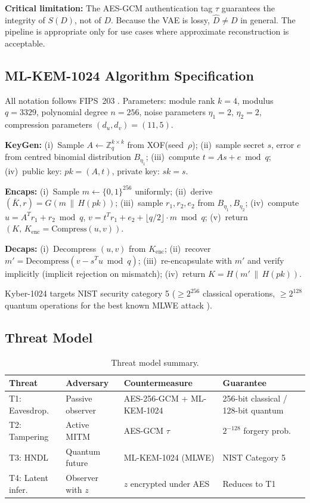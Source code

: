 \documentclass[twocolumn]{article}
\begin{document}
\smallskip
\noindent\textbf{Critical limitation:} The AES-GCM authentication tag $\tau$
guarantees the integrity of $S(D)$, not of $D$. Because the VAE is lossy,
$\hat{D} \neq D$ in general. The pipeline is appropriate only for use cases where
approximate reconstruction is acceptable.

\subsection{ML-KEM-1024 Algorithm Specification}

All notation follows FIPS~203 \cite{fips203}. Parameters: module rank $k = 4$,
modulus $q = 3329$, polynomial degree $n = 256$, noise parameters $\eta_1 = 2$,
$\eta_2 = 2$, compression parameters $(d_u, d_v) = (11, 5)$.

\textbf{KeyGen:} (i)~Sample $A \leftarrow \mathbb{Z}_q^{k\times k}$ from XOF(seed~$\rho$);
(ii)~sample secret $s$, error $e$ from centred binomial distribution $B_{\eta_1}$;
(iii)~compute $t = As + e \bmod q$; (iv)~public key: $pk = (A,t)$, private key: $sk = s$.

\textbf{Encaps:} (i)~Sample $m \leftarrow \{0,1\}^{256}$ uniformly; (ii)~derive
$(\bar{K}, r) = G(m \,\|\, H(pk))$; (iii)~sample $r_1,r_2,e_2$ from
$B_{\eta_1},B_{\eta_2}$; (iv)~compute $u = A^T r_1 + r_2 \bmod q$, $v = t^T r_1
+ e_2 + \lfloor q/2 \rfloor \cdot m \bmod q$; (v)~return $(K,\,K_\text{enc} =
\text{Compress}(u,v))$.

\textbf{Decaps:} (i)~Decompress $(u,v)$ from $K_\text{enc}$; (ii)~recover
$m' = \text{Decompress}(v - s^T u \bmod q)$; (iii)~re-encapsulate with $m'$ and
verify implicitly (implicit rejection on mismatch); (iv)~return $K = H(m' \,\|\,
H(pk))$.

Kyber-1024 targets NIST security category 5 ($\geq 2^{256}$ classical operations,
$\geq 2^{128}$ quantum operations for the best known MLWE attack \cite{fips203}).

\subsection{Threat Model}

\begin{table}[t]
\caption{Threat model summary.}
\label{tab:threat}
\centering\small
\begin{tabular}{p{1.4cm}p{2.0cm}p{2.2cm}p{1.8cm}}
\toprule
Threat & Adversary & Countermeasure & Guarantee \\
\midrule
T1: Eavesdrop. & Passive observer & AES-256-GCM + ML-KEM-1024 & 256-bit classical / 128-bit quantum \\
T2: Tampering & Active MITM & AES-GCM $\tau$ & $2^{-128}$ forgery prob. \\
T3: HNDL & Quantum future & ML-KEM-1024 (MLWE) & NIST Category 5 \\
T4: Latent infer. & Observer with $z$ & $z$ encrypted under AES & Reduces to T1 \\
\bottomrule
\end{tabular}
\end{table}
\end{document}
